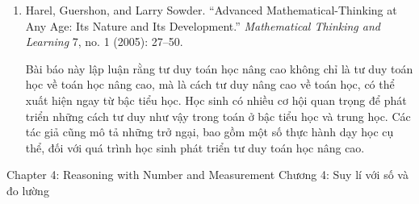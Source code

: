 {{\begin{enumerate}
          \par\noindent\hspace*{1em} Tác giả định nghĩa suy lí thống kê và thảo luận các nghiên cứu về chủ đề này. Bà cũng mô tả một mô hình phát triển gồm năm giai đoạn suy lí thống kê của học sinh. Ngoài ra, bà xem xét hàm ý đối với đánh giá và dạy học.\vspace{1.35\baselineskip}

        \item Harel, Guershon, and Larry Sowder. ``Advanced Mathematical-Thinking at Any Age: Its Nature and Its Development.'' \emph{Mathematical Thinking and Learning} 7, no. 1 (2005): 27--50.\vspace{.25\baselineskip}

          \par\noindent\hspace*{1em} Bài báo này lập luận rằng tư duy toán học nâng cao không chỉ là tư duy toán học về toán học nâng cao, mà là cách tư duy nâng cao về toán học, có thể xuất hiện ngay từ bậc tiểu học. Học sinh có nhiều cơ hội quan trọng để phát triển những cách tư duy như vậy trong toán ở bậc tiểu học và trung học. Các tác giả cũng mô tả những trở ngại, bao gồm một số thực hành dạy học cụ thể, đối với quá trình học sinh phát triển tư duy toán học nâng cao.
      \end{enumerate}}
  }{\NOTE{}}

\ParallelSection
  {Chapter 4: Reasoning with Number and Measurement}
  {Chương 4: Suy lí với số và đo lường}
  {}

